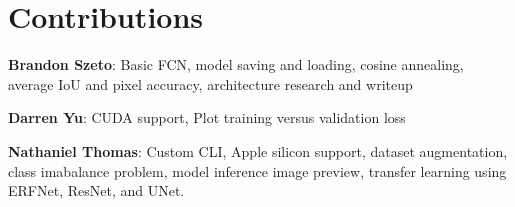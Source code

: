 \section*{Contributions}

\textbf{Brandon Szeto}: Basic FCN, model saving and loading, cosine annealing, average IoU and pixel accuracy, architecture research and writeup

\textbf{Darren Yu}: CUDA support, Plot training versus validation loss

\textbf{Nathaniel Thomas}: Custom CLI, Apple silicon support, dataset augmentation, class imabalance problem, model inference image preview, transfer learning using ERFNet, ResNet, and UNet.
